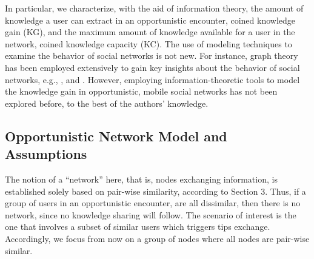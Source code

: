 \documentclass[conference]{IEEEtran}
\theoremstyle{definition}
\begin{document}
In particular, we characterize, with the aid of information theory, the amount of knowledge a user can extract in an opportunistic encounter, coined knowledge gain (KG), and the maximum amount of knowledge available for a user in the network, coined knowledge capacity (KC). The use of modeling techniques to examine the behavior of social networks is not new. For instance, graph theory has been employed extensively to gain key insights about the behavior 
of social networks, e.g., \cite{graph1}, \cite{graph2} and \cite{graph3}. However, employing information-theoretic tools to model the knowledge gain in opportunistic, mobile social networks has not been explored before, to the best of the authors' knowledge.


\vspace{-0.5 cm}
\subsection{Opportunistic Network Model and Assumptions}
\vspace{-0.2 cm}
The notion of a ``network'' here, that is, nodes exchanging information, 
is established solely based on pair-wise similarity, according to Section 3.
Thus, if a group of users in an opportunistic encounter, are all dissimilar, then there is no 
network, since no knowledge sharing will follow. The scenario of interest is the one that involves a subset of similar users which triggers tips exchange. Accordingly, we focus from now on a group of nodes where all nodes are pair-wise similar.
  
\end{document}
